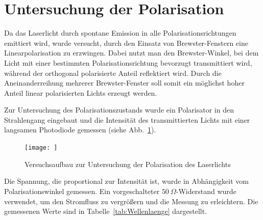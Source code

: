 \section{Untersuchung der Polarisation}

Da das Laserlicht durch spontane Emission in alle Polarisationsrichtungen emittiert wird, wurde versucht, durch den Einsatz von Brewster-Fenstern eine Linearpolarisation zu erzwingen. 
Dabei nutzt man den Brewster-Winkel, bei dem Licht mit einer bestimmten Polarisationsrichtung bevorzugt transmittiert wird, während der orthogonal polarisierte Anteil reflektiert wird. 
Durch die Aneinanderreihung mehrerer Brewster-Fenster soll somit ein möglichst hoher Anteil linear polarisierten Lichts erzeugt werden.


Zur Untersuchung des Polarisationszustands wurde ein Polarisator in den Strahlengang eingebaut und die Intensität des transmittierten Lichts mit einer langsamen Photodiode gemessen (siehe Abb.~\ref{fig:Polar}).


\begin{figure}[H]
    \centering
    \texttt{[image: ]}
    \caption{Versuchsaufbau zur Untersuchung der Polarisation des Laserlichts}
    \label{fig:Polar}
\end{figure}

Die Spannung, die proportional zur Intensität ist, wurde in Abhängigkeit vom Polarisationswinkel gemessen. 
Ein vorgeschalteter $50~\Omega$-Widerstand wurde verwendet, um den Stromfluss zu vergrößern und die Messung zu erleichtern. 
Die gemessenen Werte sind in Tabelle~\ref{tab:Wellenlaenge} dargestellt.

